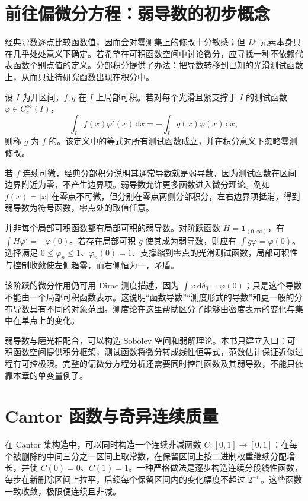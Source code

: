 \documentclass[UTF8,12pt,a4paper,fontset=fandol]{ctexbook}
\begin{document}
\section{前往偏微分方程：弱导数的初步概念}
经典导数逐点比较函数值，因而会对零测集上的修改十分敏感；但 $L^p$ 元素本身只在几乎处处意义下确定。若希望在可积函数空间中讨论微分，应寻找一种不依赖代表函数个别点值的定义。分部积分提供了办法：把导数转移到已知的光滑测试函数上，从而只让待研究函数出现在积分中。

\begin{definition}
设 $I$ 为开区间，$f,g$ 在 $I$ 上局部可积。若对每个光滑且紧支撑于 $I$ 的测试函数 $\varphi\in C_c^\infty(I)$，
\[
 \int_I f(x)\varphi'(x)\,\mathrm dx
 =-\int_I g(x)\varphi(x)\,\mathrm dx,
\]
则称 $g$ 为 $f$ 的。该定义中的等式对所有测试函数成立，并在积分意义下忽略零测修改。
\end{definition}
若 $f$ 连续可微，经典分部积分说明其通常导数就是弱导数，因为测试函数在区间边界附近为零，不产生边界项。弱导数允许更多函数进入微分理论。例如 $f(x)=|x|$ 在零点不可微，但分别在零点两侧分部积分，左右边界项抵消，得到弱导数为符号函数，零点处的取值任意。

并非每个局部可积函数都有局部可积的弱导数。对阶跃函数 $H=\mathbf1_{(0,\infty)}$，有 $\int H\varphi'=-\varphi(0)$。若存在局部可积 $g$ 使其成为弱导数，则应有 $\int g\varphi=\varphi(0)$。选择满足 $0\leq\varphi_n\leq1$、$\varphi_n(0)=1$、支撑缩到零点的光滑测试函数，局部可积性与控制收敛使左侧趋零，而右侧恒为一，矛盾。

该阶跃的微分作用仍可用 Dirac 测度描述，因为 $\int\varphi\,\mathrm d\delta_0=\varphi(0)$；只是这个导数不能由一个局部可积函数表示。这说明“函数导数”“测度形式的导数”和更一般的分布导数具有不同的对象范围。测度论在这里帮助区分了能够由密度表示的变化与集中在单点上的变化。

弱导数与磨光相配合，可以构造 Sobolev 空间和弱解理论。本书只建立入口：可积函数空间提供积分框架，测试函数将微分转成线性恒等式，范数估计保证近似过程有可控极限。完整的偏微分方程分析还需要同时控制函数及其弱导数，不能只依靠本章的单变量例子。

\section{Cantor 函数与奇异连续质量}
在 Cantor 集构造中，可以同时构造一个连续非减函数 $C:[0,1]\to[0,1]$：在每个被删除的中间三分之一区间上取常数，在保留区间上按二进制权重继续分配增长，并使 $C(0)=0$、$C(1)=1$。一种严格做法是逐步构造连续分段线性函数，每步在新删除区间上拉平，后续每个保留区间内的变化幅度不超过 $2^{-n}$。这些函数一致收敛，极限便连续且非减。
\end{document}
